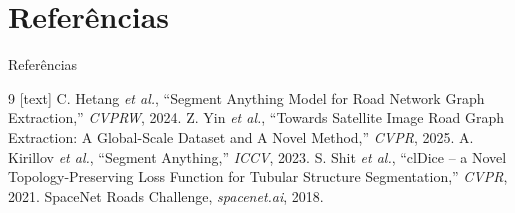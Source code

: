 \documentclass{beamer}
\begin{document}
\section{Referências}
\begin{frame}{Referências}
    \footnotesize
    \begin{thebibliography}{9}
        [text]
         C. Hetang \textit{et al.}, ``Segment Anything Model for Road Network Graph Extraction,'' \textit{CVPRW}, 2024.
         Z. Yin \textit{et al.}, ``Towards Satellite Image Road Graph Extraction: A Global-Scale Dataset and A Novel Method,'' \textit{CVPR}, 2025.
         A. Kirillov \textit{et al.}, ``Segment Anything,'' \textit{ICCV}, 2023.
         S. Shit \textit{et al.}, ``clDice -- a Novel Topology-Preserving Loss Function for Tubular Structure Segmentation,'' \textit{CVPR}, 2021.
         SpaceNet Roads Challenge, \textit{spacenet.ai}, 2018.
    \end{thebibliography}
\end{frame}
\end{document}
